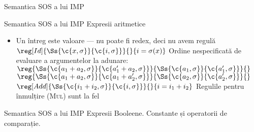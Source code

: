 \documentclass[xcolor=pdftex,romanian,colorlinks]{beamer}
\begin{document}
\begin{section}{Semantica SOS a lui IMP}
\begin{comment}
  $$\sigma[v/x] (y) = \left\{\begin{array}{r@{\mbox{, dacă }}l}
  \sigma	(y) & y \neq x \\
  v & y = x
  \end{array}
  \right.$$
  \end{itemize}
  \end{block}
  \end{frame}
  \end{subsection}
\end{comment}
  \begin{frame}{Semantica SOS a lui IMP}
  {Expresii aritmetice}
  \begin{itemize}
  \item Un întreg este valoare --- nu poate fi redex, deci nu avem regulă
  \vitem[] $\reg[Id]{\Ss{\c{x,\sigma}}{\c{i, \sigma}}}{}{i = \sigma(x)}$
  \vitem Ordine nespecificată de evaluare a argumentelor la adunare:
  \vitem[] $\reg{\Ss{\c{a_1 + a_2,\sigma}}{\c{a_1' + a_2,\sigma}}}{\Ss{\c{a_1,\sigma}}{\c{a_1',\sigma}}}{}$\hfill$\reg{\Ss{\c{a_1 + a_2,\sigma}}{\c{a_1 + a_2',\sigma}}}{\Ss{\c{a_2,\sigma}}{\c{a_2',\sigma}}}{}$
  \vitem[] $\reg[Add]{\Ss{\c{i_1 + i_2,\sigma}}{\c{i,\sigma}}}{}{i = i_1 + i_2}$
  \vitem Regulile pentru înmulțire (\textsc{Mul}) sunt la fel
  \end{itemize}
  \end{frame}
  \begin{frame}{Semantica SOS a lui IMP}
  {Expresii Booleene. Constante și operatorii de comparație.}

\end{frame}
\end{section}
\end{document}
